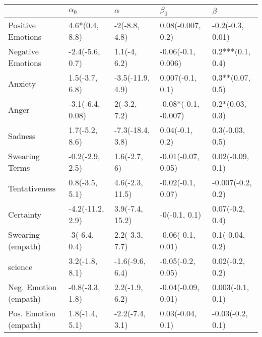 \begin{tabular}{lllll}
\toprule
{} &        $\alpha_0$ &          $\alpha$ &             $\beta_0$ &            $\beta$ \\
\midrule
Positive Emotions     &    4.6*(0.4, 8.8) &     -2(-8.8, 4.8) &     0.08(-0.007, 0.2) &   -0.2(-0.3, 0.01) \\
Negative Emotions     &   -2.4(-5.6, 0.7) &      1.1(-4, 6.2) &    -0.06(-0.1, 0.006) &   0.2***(0.1, 0.4) \\
Anxiety               &    1.5(-3.7, 6.8) &  -3.5(-11.9, 4.9) &      0.007(-0.1, 0.1) &   0.3**(0.07, 0.5) \\
Anger                 &  -3.1(-6.4, 0.08) &      2(-3.2, 7.2) &  -0.08*(-0.1, -0.007) &    0.2*(0.03, 0.3) \\
Sadness               &    1.7(-5.2, 8.6) &  -7.3(-18.4, 3.8) &       0.04(-0.1, 0.2) &    0.3(-0.03, 0.5) \\
Swearing Terms        &   -0.2(-2.9, 2.5) &      1.6(-2.7, 6) &    -0.01(-0.07, 0.05) &   0.02(-0.09, 0.1) \\
Tentativeness         &    0.8(-3.5, 5.1) &   4.6(-2.3, 11.5) &     -0.02(-0.1, 0.07) &  -0.007(-0.2, 0.2) \\
Certainty             &  -4.2(-11.2, 2.9) &   3.9(-7.4, 15.2) &         -0(-0.1, 0.1) &    0.07(-0.2, 0.4) \\
Swearing (empath)     &     -3(-6.4, 0.4) &    2.2(-3.3, 7.7) &     -0.06(-0.1, 0.01) &    0.1(-0.04, 0.2) \\
science               &    3.2(-1.8, 8.1) &   -1.6(-9.6, 6.4) &     -0.05(-0.2, 0.05) &    0.02(-0.2, 0.2) \\
Neg. Emotion (empath) &   -0.8(-3.3, 1.8) &    2.2(-1.9, 6.2) &    -0.04(-0.09, 0.01) &   0.003(-0.1, 0.1) \\
Pos. Emotion (empath) &    1.8(-1.4, 5.1) &   -2.2(-7.4, 3.1) &      0.03(-0.04, 0.1) &   -0.03(-0.2, 0.1) \\
\bottomrule
\end{tabular}
